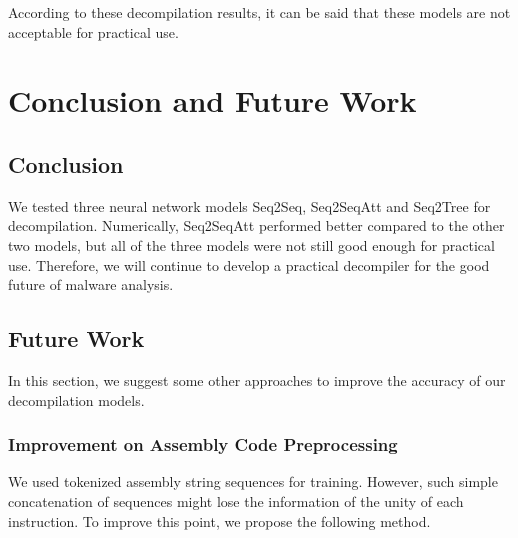 \documentclass[11pt]{jarticle}
\begin{document}
According to these decompilation results, it can be said that these models are not acceptable for practical use.






\chapter{Conclusion and Future Work}
\section{Conclusion}
We tested three neural network models Seq2Seq, Seq2SeqAtt and Seq2Tree for decompilation.
Numerically, Seq2SeqAtt performed better compared to the other two models,
but all of the three models were not still good enough for practical use.
Therefore, we will continue to develop a practical decompiler for the good future of malware analysis.

\section{Future Work}
In this section, we suggest some other approaches to improve the accuracy of our decompilation models.

\subsection{Improvement on Assembly Code Preprocessing}
We used tokenized assembly string sequences for training. 
However, such simple concatenation of sequences might lose the information of the unity of each instruction.
To improve this point, we propose the following method.
\end{document}
